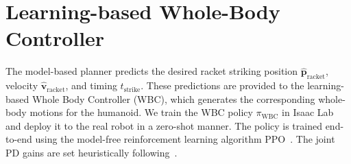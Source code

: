 \section{Learning-based Whole-Body Controller}
The model-based planner predicts the desired racket striking position $\hat{\mathbf{p}}_{\mathrm{racket}}$, velocity $\hat{\mathbf{v}}_{\mathrm{racket}}$, and timing $t_{\mathrm{strike}}$. 
These predictions are provided to the learning-based Whole Body Controller (WBC), which generates the corresponding whole-body motions for the humanoid. We train the WBC policy $\pi_\text{WBC}$ in Isaac Lab~\cite{mittal2023orbit} and deploy it to the real robot in a zero-shot manner. The policy is trained end-to-end using the model-free reinforcement learning algorithm PPO~\cite{schulman2017proximal}. The joint PD gains are set heuristically following~\cite{liao2025beyond}.

